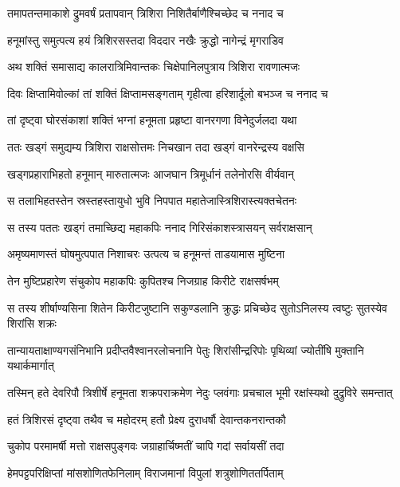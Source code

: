 \twolineshloka
{तमापतन्तमाकाशे द्रुमवर्षं प्रतापवान्}
{त्रिशिरा निशितैर्बाणैश्चिच्छेद च ननाद च} %

\twolineshloka
{हनूमांस्तु समुत्पत्य हयं त्रिशिरसस्तदा}
{विददार नखैः क्रुद्धो नागेन्द्रं मृगराडिव} %

\twolineshloka
{अथ शक्तिं समासाद्य कालरात्रिमिवान्तकः}
{चिक्षेपानिलपुत्राय त्रिशिरा रावणात्मजः} %

\twolineshloka
{दिवः क्षिप्तामिवोल्कां तां शक्तिं क्षिप्तामसङ्गताम्}
{गृहीत्वा हरिशार्दूलो बभञ्ज च ननाद च} %

\twolineshloka
{तां दृष्ट्वा घोरसंकाशां शक्तिं भग्नां हनूमता}
{प्रहृष्टा वानरगणा विनेदुर्जलदा यथा} %

\twolineshloka
{ततः खड्गं समुद्यम्य त्रिशिरा राक्षसोत्तमः}
{निचखान तदा खड्गं वानरेन्द्रस्य वक्षसि} %

\twolineshloka
{खड्गप्रहाराभिहतो हनूमान् मारुतात्मजः}
{आजघान त्रिमूर्धानं तलेनोरसि वीर्यवान्} %

\twolineshloka
{स तलाभिहतस्तेन स्रस्तहस्तायुधो भुवि}
{निपपात महातेजास्त्रिशिरास्त्यक्तचेतनः} %

\twolineshloka
{स तस्य पततः खड्गं तमाच्छिद्य महाकपिः}
{ननाद गिरिसंकाशस्त्रासयन् सर्वराक्षसान्} %

\twolineshloka
{अमृष्यमाणस्तं घोषमुत्पपात निशाचरः}
{उत्पत्य च हनूमन्तं ताडयामास मुष्टिना} %

\twolineshloka
{तेन मुष्टिप्रहारेण संचुकोप महाकपिः}
{कुपितश्च निजग्राह किरीटे राक्षसर्षभम्} %

\twolineshloka
{स तस्य शीर्षाण्यसिना शितेन किरीटजुष्टानि सकुण्डलानि}
{क्रुद्धः प्रचिच्छेद सुतोऽनिलस्य त्वष्टुः सुतस्येव शिरांसि शक्रः} %

\twolineshloka
{तान्यायताक्षाण्यगसंनिभानि प्रदीप्तवैश्वानरलोचनानि}
{पेतुः शिरांसीन्द्ररिपोः पृथिव्यां ज्योतींषि मुक्तानि यथार्कमार्गात्} %

\twolineshloka
{तस्मिन् हते देवरिपौ त्रिशीर्षे हनूमता शक्रपराक्रमेण}
{नेदुः प्लवंगाः प्रचचाल भूमी रक्षांस्यथो दुद्रुविरे समन्तात्} %

\twolineshloka
{हतं त्रिशिरसं दृष्ट्वा तथैव च महोदरम्}
{हतौ प्रेक्ष्य दुराधर्षौ देवान्तकनरान्तकौ} %

\twolineshloka
{चुकोप परमामर्षी मत्तो राक्षसपुङ्गवः}
{जग्राहार्चिष्मतीं चापि गदां सर्वायसीं तदा} %

\twolineshloka
{हेमपट्टपरिक्षिप्तां मांसशोणितफेनिलाम्}
{विराजमानां विपुलां शत्रुशोणिततर्पिताम्} %

